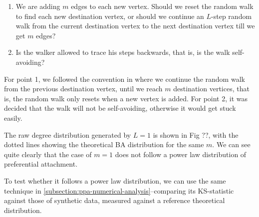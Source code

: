 \begin{enumerate}
	\item We are adding $m$ edges to each new vertex. Should we reset the random walk to find each new destination vertex, or should we continue an $L$-step random walk from the current destination vertex to the next destination vertex till we get $m$ edges?
	\item Is the walker allowed to trace his steps backwards, that is, is the walk self-avoiding?
\end{enumerate}

For point 1, we followed the convention in \citet{Saramaki2004} where we continue the random walk from the previous destination vertex, until we reach $m$ destination vertices, that is, the random walk only resets when a new vertex is added. For point 2, it was decided that the walk will not be self-avoiding, otherwise it would get stuck easily. 

The raw degree distribution generated by $L = 1$ is shown in Fig ??, with the dotted lines showing the theoretical BA distribution for the same $m$. We can see quite clearly that the case of $m = 1$ does not follow a power law distribution of preferential attachment. 

To test whether it follows a power law distribution, we can use the same technique in \autoref{subsection:ppa-numerical-analysis}--comparing its KS-statistic against those of synthetic data, measured against a reference theoretical distribution.  